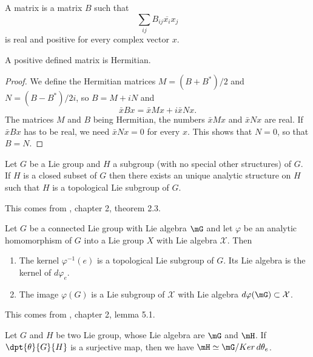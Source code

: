\begin{definition}
	A  matrix is a matrix $B$ such that
	\begin{equation}
		\sum_{ij}B_{ij}\overline{ x_i }x_j
	\end{equation}
	is real and positive for every complex vector $x$.
\end{definition}

\begin{proposition}
	A positive defined matrix is Hermitian.
\end{proposition}

\begin{proof}
	We define the Hermitian matrices $M=(B+B^*)/2$ and $N=(B-B^*)/2i$, so $B=M+iN$ and
	\begin{equation}
		\bar x Bx=\bar x M x+i\bar x Nx.
	\end{equation}
	The matrices $M$ and $B$ being Hermitian, the numbers $\bar xMx$ and $\bar xNx$ are real. If $\bar xBx$ has to be real, we need $\bar xNx=0$ for every $x$. This shows that $N=0$, so that $B=N$.
\end{proof}

\begin{theorem}
	Let $G$ be a Lie group and $H$ a subgroup (with no special other structures) of $G$. If $H$ is a closed subset of $G$ then there exists an unique analytic structure on $H$ such that $H$ is a topological Lie subgroup of $G$.
	\label{Helgason2.3}
\end{theorem}
This comes from \cite{Helgason}, chapter 2, theorem 2.3.

\begin{lemma}
	Let $G$ be a connected Lie group with Lie algebra $\mG$ and let $\varphi$ be an analytic homomorphism of $G$ into a Lie group $X$ with Lie algebra $\mathcal{X}$. Then

	\begin{enumerate}
		\item The kernel $\varphi^{-1}(e)$ is a topological Lie subgroup of $G$. Its Lie algebra is the kernel of $d\varphi_e$.
		\item The image $\varphi(G)$ is a Lie subgroup of $\mathcal{X}$ with Lie algebra $d\varphi(\mG)\subset\mathcal{X}$.
	\end{enumerate}
	\label{Helgason5.1}
\end{lemma}
This comes from \cite{Helgason}, chapter 2, lemma 5.1.

\begin{lemma}
	Let $G$ and $H$ be two Lie group, whose Lie algebra are $\mG$ and $\mH$. If $\dpt{\theta}{G}{H}$ is a surjective map, then we have $\mH\simeq\mG/Ker\,d\theta_e$.
	\label{1203r1}
\end{lemma}

